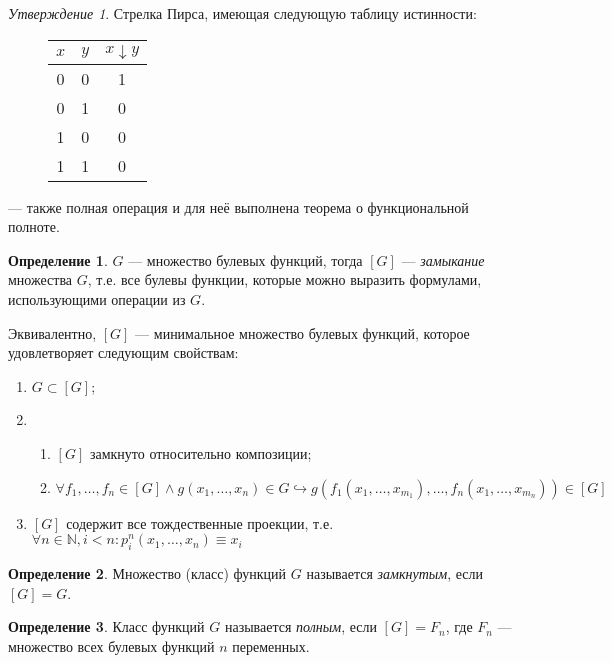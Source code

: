 \documentclass[12pt]{article}
\let\eq\equiv
\def\NN{\mathbb{N}}
\theoremstyle{definition}
\newtheorem{definition}{Определение}[section]
\theoremstyle{plain}
\theoremstyle{remark}
\newtheorem{statement}{Утверждение}[section]
\begin{document}
\begin{statement}
  Стрелка Пирса, имеющая следующую таблицу истинности:
  \begin{figure}[H]
    \centering
    \begin{tabular}{c|c|c}
      $x$ & $y$ & $x \downarrow y$\\\hline
      0 & 0 & 1\\\hline
      0 & 1 & 0\\\hline
      1 & 0 & 0\\\hline
      1 & 1 & 0
    \end{tabular}
  \end{figure}
  --- также
  полная операция и для неё выполнена теорема о функциональной полноте.
\end{statement}
\begin{definition}
  $G$ --- множество булевых функций, тогда $[G]$ ---
  \textit{замыкание} множества $G$, т.е. все булевы функции, которые
  можно выразить формулами, использующими операции из $G$.

  Эквивалентно, $[G]$ --- минимальное множество булевых функций,
  которое удовлетворяет следующим свойствам:
  \begin{enumerate}
    \item $G \subset [G]$;

    \item
      \begin{enumerate}
        \item $[G]$ замкнуто относительно композиции;

        \item $\forall f_1, \ldots, f_n \in [G] \land g(x_1, \ldots, x_n)
          \in G \hookrightarrow g(f_1(x_1, \ldots, x_{m_1}), \ldots,
          f_n(x_1, \ldots, x_{m_n})) \in [G]$
      \end{enumerate}

    \item $[G]$ содержит все тождественные проекции, т.е. $\forall n
      \in \NN, i < n \colon p_i^n(x_1, \ldots, x_n) \eq x_i$
  \end{enumerate}
\end{definition}
\begin{definition}
  Множество (класс) функций $G$ называется \textit{замкнутым}, если $[G] = G$.
\end{definition}
\begin{definition}
  Класс функций $G$ называется \textit{полным}, если $[G] = F_n$, где
  $F_n$ --- множество всех булевых функций $n$ переменных.
\end{definition}
\end{document}
